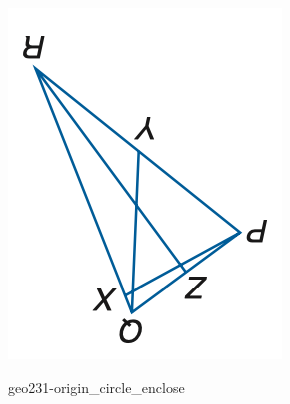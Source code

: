 \documentclass[12pt]{article}
\begin{document}
\begin{center}
\begin{minipage}{0.32\textwidth}
\includegraphics[width=0.95\linewidth]{out_rommath_origin/items/geo231-origin/assets/figure_rot180.png}
\end{minipage}
\hfill\begin{minipage}{0.32\textwidth}\centering
geo231-origin\_circle\_enclose\\

\end{minipage}
\end{center}
\end{document}
